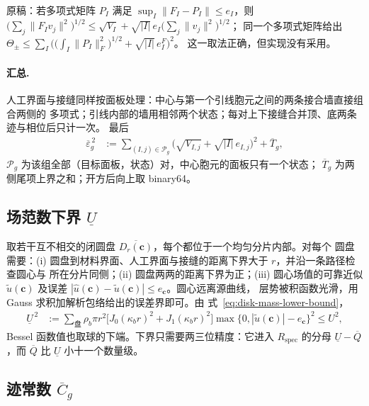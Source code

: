 \begin{workonly}
原稿：若多项式矩阵 $P_I$ 满足 $\sup_I\lVert F_I-P_I\rVert\leq e_I$，则
$\bigl(\sum_{j}\lVert F_Iv_j\rVert^2\bigr)^{1/2}\leq\sqrt{V_I}+\sqrt{|I|}\,e_I\bigl(\sum_j\lVert v_j\rVert^2\bigr)^{1/2}$；
同一个多项式矩阵给出
$\Theta_\pm\leq\sum_I\bigl(\bigl(\int_I\lVert P_I\rVert_F^2\bigr)^{1/2}+\sqrt{|I|}\,e_I^F\bigr)^2$。
这一取法正确，但实现没有采用。
\end{workonly}

\paragraph{汇总.}
人工界面与接缝同样按面板处理：中心与第一个引线胞元之间的两条接合墙直接组合两侧的
多项式；引线内部的墙用相邻两个状态；每对上下接缝合并顶、底两条迹与相位后只计一次。
最后
\begin{align}
  \overline\varepsilon_g^{\,2}
  &:=\sum_{(I,j)\in\mathscr P_g}\bigl(\sqrt{V_{I,j}}+\sqrt{|I|}\,e_{I,j}\bigr)^2+\overline T_g,
  \label{eq:group-defect-assembly}
\end{align}
$\mathscr P_g$ 为该组全部（目标面板，状态）对，中心胞元的面板只有一个状态；
$\overline T_g$ 为两侧尾项上界之和；开方后向上取 binary64。

\subsection{场范数下界 $\underline U$}
\label{app:reliable-mass}

取若干互不相交的闭圆盘 $\overline{D_r(\mathbf c)}$，每个都位于一个均匀分片内部。对每个
圆盘需要：(i) 圆盘到材料界面、人工界面与接缝的距离下界大于 $r$，并沿一条路径检查圆心与
所在分片同侧；(ii) 圆盘两两的距离下界为正；(iii) 圆心场值的可靠近似 $\widetilde u(\mathbf c)$
及误差 $|\widehat u(\mathbf c)-\widetilde u(\mathbf c)|\leq e_{\mathbf c}$。圆心远离源曲线，
层势被积函数光滑，用 Gauss 求积加解析包络给出的误差界即可。由
式~\eqref{eq:disk-mass-lower-bound}，
\begin{align}
  \underline U^{\,2}
  &:=\sum_{\text{盘}}\rho_b\pi r^2\bigl[J_0(\kappa_br)^2+J_1(\kappa_br)^2\bigr]
  \max\{0,|\widetilde u(\mathbf c)|-e_{\mathbf c}\}^2\leq U^2 ,
  \label{eq:disk-mass-assembly}
\end{align}
Bessel 函数值也取球的下端。下界只需要两三位精度：它进入 $R_{\mathrm{spec}}$ 的分母
$\underline U-\overline Q$，而 $\overline Q$ 比 $\underline U$ 小十一个数量级。

\subsection{迹常数 $\overline C_g$}
\label{app:reliable-cg}

